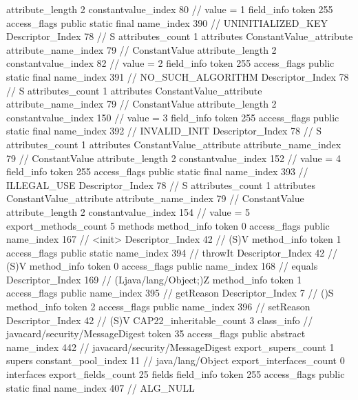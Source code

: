 {{{{{{{					attribute_length	2
					constantvalue_index	80		// value = 1
				}
				}
			}
			field_info {
				token	255
				access_flags	public static final
				name_index	390		// UNINITIALIZED_KEY
				Descriptor_Index	78		// S
				attributes_count	1
				attributes {
				ConstantValue_attribute {
					attribute_name_index	79		// ConstantValue
					attribute_length	2
					constantvalue_index	82		// value = 2
				}
				}
			}
			field_info {
				token	255
				access_flags	public static final
				name_index	391		// NO_SUCH_ALGORITHM
				Descriptor_Index	78		// S
				attributes_count	1
				attributes {
				ConstantValue_attribute {
					attribute_name_index	79		// ConstantValue
					attribute_length	2
					constantvalue_index	150		// value = 3
				}
				}
			}
			field_info {
				token	255
				access_flags	public static final
				name_index	392		// INVALID_INIT
				Descriptor_Index	78		// S
				attributes_count	1
				attributes {
				ConstantValue_attribute {
					attribute_name_index	79		// ConstantValue
					attribute_length	2
					constantvalue_index	152		// value = 4
				}
				}
			}
			field_info {
				token	255
				access_flags	public static final
				name_index	393		// ILLEGAL_USE
				Descriptor_Index	78		// S
				attributes_count	1
				attributes {
				ConstantValue_attribute {
					attribute_name_index	79		// ConstantValue
					attribute_length	2
					constantvalue_index	154		// value = 5
				}
				}
			}
			}
			export_methods_count	5
			methods {
				method_info {
					token	0
					access_flags	public
					name_index	167		// <init>
					Descriptor_Index	42		// (S)V
				}
				method_info {
					token	1
					access_flags	public static
					name_index	394		// throwIt
					Descriptor_Index	42		// (S)V
				}
				method_info {
					token	0
					access_flags	public
					name_index	168		// equals
					Descriptor_Index	169		// (Ljava/lang/Object;)Z
				}
				method_info {
					token	1
					access_flags	public
					name_index	395		// getReason
					Descriptor_Index	7		// ()S
				}
				method_info {
					token	2
					access_flags	public
					name_index	396		// setReason
					Descriptor_Index	42		// (S)V
				}
			}
			CAP22_inheritable_count	3
		}
		class_info {		// javacard/security/MessageDigest
			token	35
			access_flags	public abstract
			name_index	442		// javacard/security/MessageDigest
			export_supers_count	1
			supers {
				constant_pool_index	11		// java/lang/Object
			}
			export_interfaces_count	0
			interfaces {
			}
			export_fields_count	25
			fields {
			field_info {
				token	255
				access_flags	public static final
				name_index	407		// ALG_NULL
}}}}}
